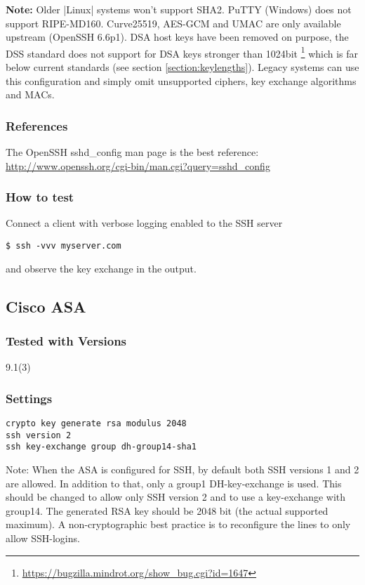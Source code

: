\textbf{Note:} Older |Linux| systems won't support SHA2. PuTTY (Windows) does not support
RIPE-MD160. Curve25519, AES-GCM and UMAC are only available upstream (OpenSSH
6.6p1). DSA host keys have been removed on purpose, the DSS standard does not
support for DSA keys stronger than 1024bit
\footnote{\url{https://bugzilla.mindrot.org/show_bug.cgi?id=1647}} which is far
below current standards (see section \ref{section:keylengths}). Legacy systems
can use this configuration and simply omit unsupported ciphers, key exchange
algorithms and MACs.

\subsubsection{References}
The OpenSSH sshd\_config  man page is the best reference: \url{http://www.openssh.org/cgi-bin/man.cgi?query=sshd_config}

\subsubsection{How to test}
Connect a client with verbose logging enabled to the SSH server
\begin{lstlisting}
$ ssh -vvv myserver.com
\end{lstlisting}and observe the key exchange in the output.


\subsection{Cisco ASA}
\subsubsection{Tested with Versions}
\begin{itemize*}
  \item 9.1(3)
\end{itemize*}


\subsubsection{Settings}
\begin{lstlisting}
crypto key generate rsa modulus 2048
ssh version 2
ssh key-exchange group dh-group14-sha1
\end{lstlisting}
Note: When the ASA is configured for SSH, by default both SSH versions 1 and 2 are allowed. In addition to that, only a group1 DH-key-exchange is used. This should be changed to allow only SSH version 2 and to use a key-exchange with group14. The generated RSA key should be 2048 bit (the actual supported maximum). A non-cryptographic best practice is to reconfigure the lines to only allow SSH-logins.

